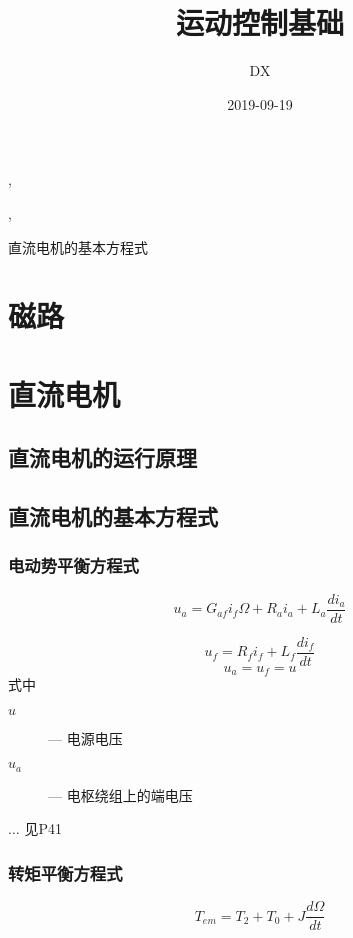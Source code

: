 \documentclass[11pt]{book}
\begin{document}
\title{运动控制基础},\author{DX},\date{2019-09-19}
\maketitle
\tableofcontents

直流电机的基本方程式

\chapter{磁路}

\chapter{直流电机}

\section{直流电机的运行原理}

\section{直流电机的基本方程式}%

\subsection{电动势平衡方程式}%
\label{sub:dian_dong_shi_ping_heng_fang_cheng_shi_}

\begin{equation}
	u_a = G_{af}i_f\Omega + R_ai_a + L_a \frac{di_a}{dt} 
\end{equation}

\begin{equation}
 u_f = R_fi_f + L_f \frac{di_f}{dt} 
\end{equation}
$$
	u_a = u_f = u
$$
式中
\begin{description}
	\item[$u$] --- 电源电压
	\item[$u_a$] --- 电枢绕组上的端电压
\end{description}
$\ldots$ 见P41

\subsection{转矩平衡方程式}%
\label{sub:zhuan_ju_ping_heng_fang_cheng_shi_}


$$
	T_{em} = T_2 + T_0 + J \frac{d\Omega}{dt} 
$$
\end{document}
